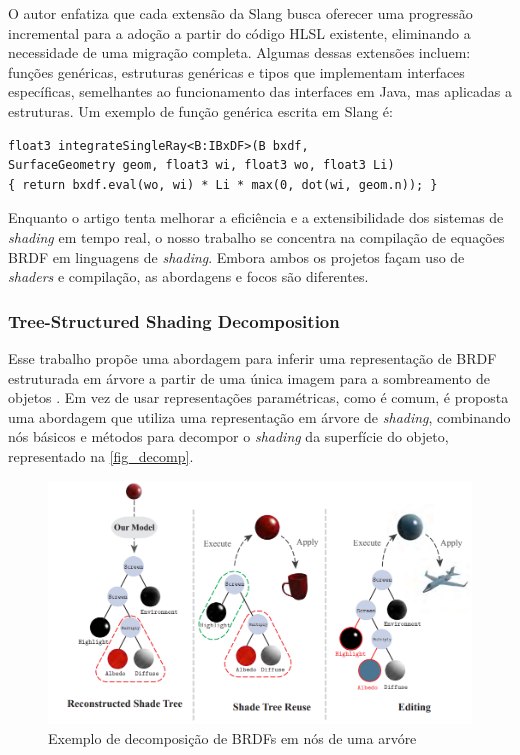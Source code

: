 \documentclass[english, 
               brazil, 
               bsc] %
               {dcomp-abntex2}
\begin{document}
O autor enfatiza que cada extensão da Slang busca oferecer uma progressão incremental para a adoção a partir do código HLSL existente, eliminando a necessidade de uma migração completa. Algumas dessas extensões incluem: funções genéricas, estruturas genéricas e tipos que implementam interfaces específicas, semelhantes ao funcionamento das interfaces em Java, mas aplicadas a estruturas. Um exemplo de função genérica escrita em Slang é:

\begin{verbatim}
float3 integrateSingleRay<B:IBxDF>(B bxdf,
SurfaceGeometry geom, float3 wi, float3 wo, float3 Li)
{ return bxdf.eval(wo, wi) * Li * max(0, dot(wi, geom.n)); }

\end{verbatim}


Enquanto o artigo tenta melhorar a eficiência e a extensibilidade dos sistemas de \textit{shading} em tempo real, o nosso trabalho se concentra na compilação de equações BRDF em linguagens de \textit{shading}. Embora ambos os projetos façam uso de \textit{shaders} e compilação, as abordagens e focos são diferentes.

\subsubsection{Tree-Structured Shading Decomposition}

Esse trabalho propõe uma abordagem para inferir uma representação de BRDF estruturada em árvore a partir de uma única imagem para a sombreamento de objetos \cite{tree_decomposition}. Em vez de usar representações paramétricas, como é comum, é proposta uma abordagem que utiliza uma representação em árvore de \textit{shading}, combinando nós básicos e métodos para decompor o \textit{shading} da superfície do objeto, representado na \autoref{fig_decomp}.

\begin{figure}[H]
	\caption{\label{fig_decomp} Exemplo de decomposição de BRDFs em nós de uma arvóre}
	\begin{center}
	    \includegraphics[scale=0.5]{./Imagens/tree-shading.png}
	\end{center}
\end{figure}
\end{document}

